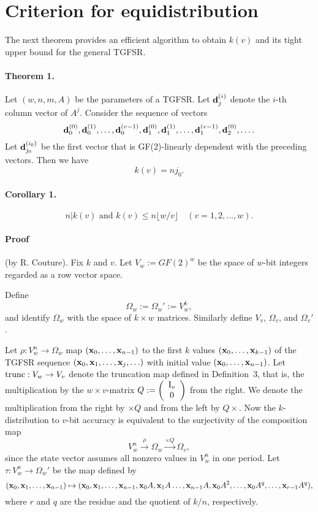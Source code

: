 \section{Criterion for equidistribution}

The next theorem provides an efficient algorithm to obtain $k(v)$
and its tight upper bound for the general TGFSR.

\paragraph{Theorem 1.}
Let $(w,n,m,A)$ be the parameters of a TGFSR.
Let ${\bf d}_j^{(i)}$ denote the $i$-th column vector of
$A^j$. Consider the sequence of vectors
$$
 {\bf d}_0^{(0)}, 
 {\bf d}_0^{(1)}, 
 \ldots,
 {\bf d}_0^{(v-1)},
 {\bf d}_1^{(0)}, 
 {\bf d}_1^{(1)}, 
 \ldots,
 {\bf d}_1^{(v-1)},
 {\bf d}_2^{(0)}, 
 \ldots.
$$ 
Let ${\bf d}_{j_0}^{(i_0)}$ be the first vector that is
GF(2)-linearly dependent with the preceding vectors.
Then we have 
$$k(v)=nj_0.$$

\paragraph{Corollary 1.}
$$n|k(v) \mbox{ and } k(v)\leq n\lfloor w/v \rfloor \quad (v=1,2,\ldots,w).$$

\paragraph{Proof} (by R. Couture).
Fix $k$ and $v$.
Let $V_w:=GF(2)^w$ be the space of $w$-bit integers regarded as
a row vector space.

Define 
$$
\Omega_w:=\Omega_w':=V_w^k,
$$
and identify $\Omega_w$ with the space of $k\times w$ matrices.
Similarly define $V_v$, $\Omega_v$, and $\Omega_v'$.

Let $\rho:V_w^n \rightarrow \Omega_w$
map 
$({\bf x}_0,\ldots,{\bf x}_{n-1})$ to
the first $k$ values 
$({\bf x}_0,\ldots,{\bf x}_{k-1})$ of the TGFSR sequence
$({\bf x}_0,{\bf x}_1,\ldots,{\bf x}_j,\ldots)$ with initial value
$({\bf x}_0,\ldots,{\bf x}_{n-1})$.
Let
$\mbox{trunc}:V_w\rightarrow V_v$
denote the truncation map defined in Definition~3,
that is, the multiplication by the $w\times v$-matrix
$Q:=\left(\begin{array}{c} {\rm I}_v \\ 0 \end{array}\right)$
from the right.
We denote the multiplication from the right by $\times Q$
and from the left by $Q\times$.
Now the $k$-distribution to $v$-bit accuracy
is equivalent to the surjectivity of 
the composition map
$$
V_w^n \stackrel{\rho}{\rightarrow}\Omega_w
\stackrel{\times Q}{\rightarrow} \Omega_v,
$$
since the state vector assumes all nonzero values in $V_w^n$
in one period.
Let
$\tau:V_w^n \rightarrow \Omega_w'$
be the map defined by
$$
({\bf x}_0,{\bf x}_1,\ldots,{\bf x}_{n-1})\mapsto
({\bf x}_0,{\bf x}_1,\ldots,{\bf x}_{n-1},{\bf x}_0A,{\bf x}_1A\ldots,{\bf x}_{n-1}A,
{\bf x}_0A^2,\ldots, {\bf x}_0A^q,\ldots,{\bf x}_{r-1}A^q),
$$
where $r$ and $q$ are the residue and the quotient
of $k/n$, respectively.

